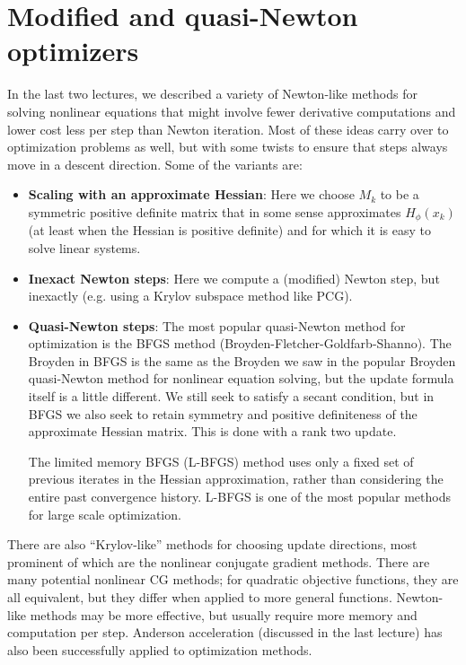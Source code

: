 \documentclass[12pt, leqno]{article} %
\begin{document}
\section{Modified and quasi-Newton optimizers}

In the last two lectures, we described a variety of Newton-like
methods for solving nonlinear equations that might involve fewer
derivative computations and lower cost less per step than Newton
iteration.  Most of these ideas carry over to optimization problems as
well, but with some twists to ensure that steps always move in a
descent direction.  Some of the variants are:
\begin{itemize}
\item
  {\bf Scaling with an approximate Hessian}: Here we choose $M_k$ to be a
  symmetric positive definite matrix that in some sense approximates
  $H_{\phi}(x_k)$ (at least when the Hessian is positive definite) and
  for which it is easy to solve linear systems.
\item
  {\bf Inexact Newton steps}: Here we compute a (modified) Newton step,
  but inexactly (e.g. using a Krylov subspace method like PCG).
\item
  {\bf Quasi-Newton steps}: The most popular quasi-Newton method for
  optimization is the BFGS method (Broyden-Fletcher-Goldfarb-Shanno).
  The Broyden in BFGS is the same as the Broyden we saw in the popular
  Broyden quasi-Newton method for nonlinear equation solving, but the
  update formula itself is a little different.  We still seek to
  satisfy a secant condition, but in BFGS we also seek to retain
  symmetry and positive definiteness of the approximate Hessian
  matrix.  This is done with a rank two update.

  The limited memory BFGS (L-BFGS) method uses only a fixed set of
  previous iterates in the Hessian approximation, rather than
  considering the entire past convergence history.  L-BFGS is one of
  the most popular methods for large scale optimization.
\end{itemize}

There are also ``Krylov-like'' methods for choosing update directions,
most prominent of which are the nonlinear conjugate gradient methods.
There are many potential nonlinear CG methods; for quadratic objective
functions, they are all equivalent, but they differ when applied to
more general functions.  Newton-like methods may be more effective,
but usually require more memory and computation per step.  Anderson
acceleration (discussed in the last lecture) has also been
successfully applied to optimization methods.
\end{document}
